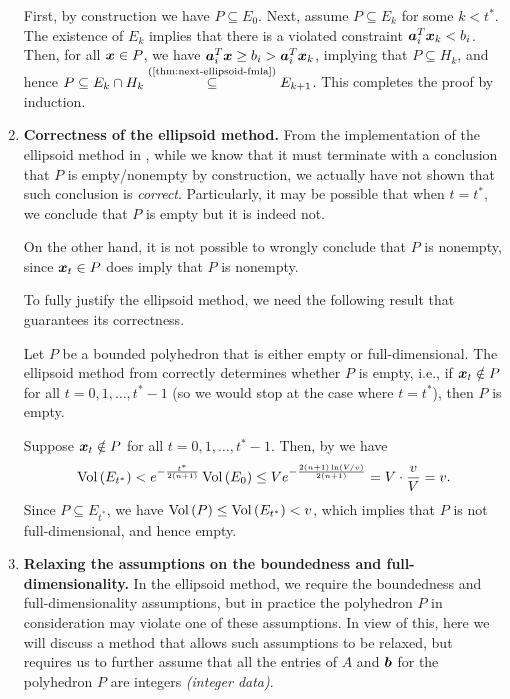 \begin{enumerate}
\begin{remark}
First, by construction we have \(P\subseteq E_0\). Next, assume \(P\subseteq
E_k\) for some \(k<t^{*}\). The existence of \(E_k\) implies that there is a
violated constraint \(\bm{a}_{i}^{T}\bm{x}_{k}< b_{i}\). Then, for all
\(\bm{x}\in P\), we have \(\bm{a}_{i}^{T}\bm{x}\ge
b_{i}>\bm{a}_{i}^{T}\bm{x}_{k}\), implying that \(P\subseteq H_k\), and
hence \(P\subseteq E_k\cap H_k
\overset{\text{(\Cref{thm:next-ellipsoid-fmla})}}{\subseteq} E_{k+1}\). This
completes the proof by induction.
\end{remark}
\item \textbf{Correctness of the ellipsoid method.} From the implementation of
the ellipsoid method in , while we know
that it must terminate with a conclusion that \(P\) is empty/nonempty by
construction, we actually have not shown that such conclusion is \emph{correct}.
Particularly, it may be possible that when \(t=t^{*}\), we conclude that \(P\) is
empty but it is indeed not. \begin{note}
On the other hand, it is not possible to wrongly conclude that \(P\) is nonempty,
since \(\bm{x}_t\in P\) does imply that \(P\) is nonempty.
\end{note}

To fully justify the ellipsoid method, we need the following result that
guarantees its correctness.

\begin{theorem}
\label{thm:ellip-method-correct}
Let \(P\) be a bounded polyhedron that is either empty or full-dimensional.
The ellipsoid method from  correctly
determines whether \(P\) is empty, i.e., if \(\bm{x}_{t}\notin P\) for all
\(t=0,1,\dotsc,t^{*}-1\) (so we would stop at the case where \(t=t^{*}\)), then
\(P\) is empty.
\end{theorem}
\begin{pf}
Suppose \(\bm{x}_{t}\notin P\) for all \(t=0,1,\dotsc,t^{*}-1\). Then, by
 we have
\[
\operatorname{Vol}\left(E_{t^{*}}\right)<e^{-\frac{t^{*}}{2(n+1)}}\operatorname{Vol}\left(E_0\right)
\le Ve^{-\frac{2(n+1)\ln (V/v)}{2(n+1)}}
=V\cdot \frac{v}{V}=v.
\]
Since \(P\subseteq E_{t^{*}}\), we have \(\operatorname{Vol}\left(P\right)\le\operatorname{Vol}\left(E_{t^{*}}\right)<v\), which
implies that \(P\) is not full-dimensional, and hence empty.
\end{pf}
\item \textbf{Relaxing the assumptions on the boundedness and full-dimensionality.}
In the ellipsoid method, we require the boundedness and full-dimensionality
assumptions, but in practice the polyhedron \(P\) in consideration may violate 
one of these assumptions. In view of this, here we will discuss a method that
allows such assumptions to be relaxed, but requires us to further assume that
all the entries of \(A\) and \(\bm{b}\) for the polyhedron \(P\) are integers
\emph{(integer data)}.


\end{enumerate}

